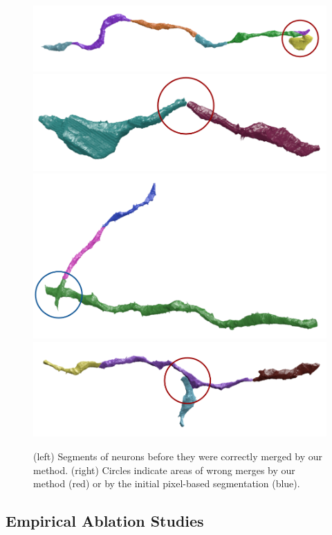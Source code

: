 \begin{figure}[t]
	\begin{minipage}{0.45\linewidth}
		\centering
		\includegraphics[width=0.85\linewidth]{./figures/VI-results/multicut-incorrect1.png}
		\includegraphics[width=0.85\linewidth]{./figures/VI-results/multicut-incorrect2.png}
		\includegraphics[width=0.85\linewidth]{./figures/VI-results/multicut-incorrect3.png}
		\includegraphics[width=0.85\linewidth]{./figures/VI-results/multicut-incorrect4.png}
	\end{minipage}
	\caption{(left) Segments of neurons before they were correctly merged by our method. (right) Circles indicate areas of wrong merges by our method (red) or by the initial pixel-based segmentation (blue).}
	\label{fig:qualitative-results}
\end{figure}

\subsection{Empirical Ablation Studies}

